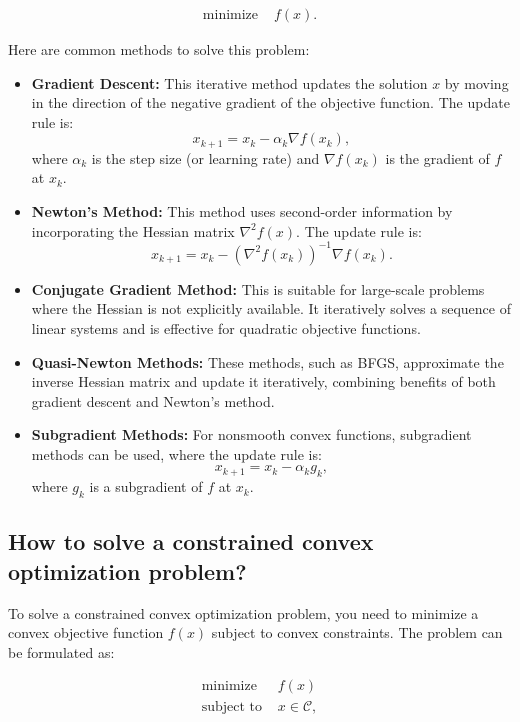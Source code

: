\begin{align*}
\text{minimize } & f(x).
\end{align*}

Here are common methods to solve this problem:

\begin{itemize}
  \item \textbf{Gradient Descent:} This iterative method updates the solution \( x \) by moving in the direction of the negative gradient of the objective function. The update rule is:
  \[
  x_{k+1} = x_k - \alpha_k \nabla f(x_k),
  \]
  where \( \alpha_k \) is the step size (or learning rate) and \( \nabla f(x_k) \) is the gradient of \( f \) at \( x_k \).

  \item \textbf{Newton's Method:} This method uses second-order information by incorporating the Hessian matrix \( \nabla^2 f(x) \). The update rule is:
  \[
  x_{k+1} = x_k - \left( \nabla^2 f(x_k) \right)^{-1} \nabla f(x_k).
  \]

  \item \textbf{Conjugate Gradient Method:} This is suitable for large-scale problems where the Hessian is not explicitly available. It iteratively solves a sequence of linear systems and is effective for quadratic objective functions.

  \item \textbf{Quasi-Newton Methods:} These methods, such as BFGS, approximate the inverse Hessian matrix and update it iteratively, combining benefits of both gradient descent and Newton’s method.

  \item \textbf{Subgradient Methods:} For nonsmooth convex functions, subgradient methods can be used, where the update rule is:
  \[
  x_{k+1} = x_k - \alpha_k g_k,
  \]
  where \( g_k \) is a subgradient of \( f \) at \( x_k \).
\end{itemize}

\subsection{How to solve a constrained convex optimization problem?}

To solve a constrained convex optimization problem, you need to minimize a convex objective function \( f(x) \) subject to convex constraints. The problem can be formulated as:

\begin{align*}
\text{minimize } & f(x) \\
\text{subject to } & x \in \mathcal{C},
\end{align*}

